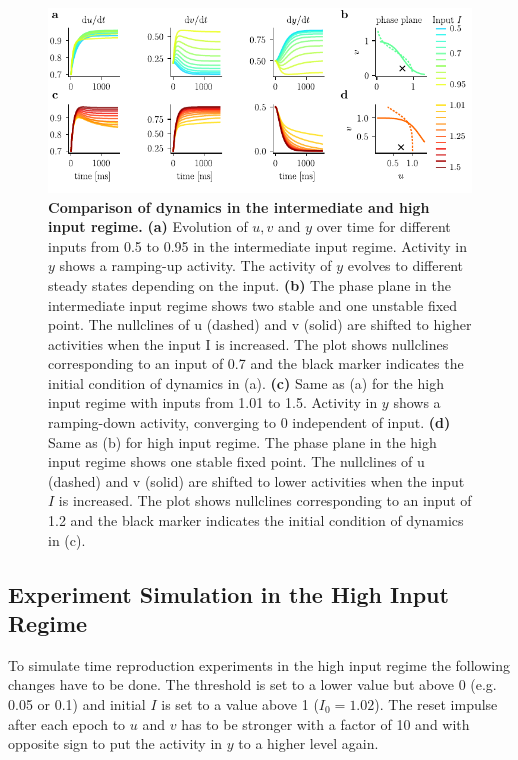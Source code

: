 \documentclass[10pt]{article}
\begin{document}
\begin{figure}[ht]
	\centering
	\includegraphics{figures/supp_regimes.pdf}
	\caption{\textbf{Comparison of dynamics in the intermediate and high input regime.} 
	\textbf{(a)} Evolution of $u, v$ and $y$ over time for different inputs from 0.5 to 0.95 in the intermediate input regime. Activity in $y$ shows a ramping-up activity. The activity of $y$ evolves to different steady states depending on the input. 
	\textbf{(b)}  The phase plane in the intermediate input regime shows two stable and one unstable fixed point. The nullclines of u (dashed) and v (solid) are shifted to higher activities when the input I is increased. The plot shows nullclines corresponding to an input of 0.7 and the black marker indicates the initial condition of dynamics in (a).
	\textbf{(c)} Same as (a) for the high input regime with inputs from 1.01 to 1.5. Activity in $y$ shows a ramping-down activity, converging to 0 independent of input.
	\textbf{(d)} Same as (b) for high input regime.  The phase plane in the high input
	regime shows one stable fixed point. The nullclines of u (dashed) and v (solid) are
	shifted to lower activities when the input $I$ is increased. The plot shows nullclines corresponding to an input of 1.2 and the black marker indicates the initial condition of dynamics in (c).
	}
\label{regimes}
\end{figure}

\subsection{Experiment Simulation in the High Input Regime}
To simulate time reproduction experiments in the high input regime the following changes have to be done. 
The threshold is set to a lower value but above 0 (e.g. 0.05 or 0.1) and initial $I$ is set to a value above 1 ($I_0 = 1.02$). The reset impulse after each epoch to $u$ and $v$ has to be stronger with a factor of 10 and with opposite sign to put the activity in $y$ to a higher level again.  
\end{document}
